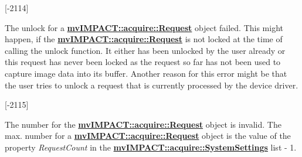 \begin{Desc}
\begin{description}
{\bfseries }\mbox{[}-\/2114\mbox{]} \item[{\em 
\hypertarget{group___common_interface_gga112225e5fbaaaef6445ff4ebf98f8e03ae52bb6755c7ab0ae3eaf035e4ce0e05c}{D\+E\+V\+\_\+\+R\+E\+Q\+U\+E\+S\+T\+\_\+\+C\+A\+N\+T\+\_\+\+B\+E\+\_\+\+U\+N\+L\+O\+C\+K\+E\+D}\label{group___common_interface_gga112225e5fbaaaef6445ff4ebf98f8e03ae52bb6755c7ab0ae3eaf035e4ce0e05c}
}]The unlock for a {\bfseries \hyperlink{classmv_i_m_p_a_c_t_1_1acquire_1_1_request}{mv\+I\+M\+P\+A\+C\+T\+::acquire\+::\+Request}} object failed. This might happen, if the {\bfseries \hyperlink{classmv_i_m_p_a_c_t_1_1acquire_1_1_request}{mv\+I\+M\+P\+A\+C\+T\+::acquire\+::\+Request}} is not locked at the time of calling the unlock function. It either has been unlocked by the user already or this request has never been locked as the request so far has not been used to capture image data into its buffer. Another reason for this error might be that the user tries to unlock a request that is currently processed by the device driver.

{\bfseries }\mbox{[}-\/2115\mbox{]} \item[{\em 
\hypertarget{group___common_interface_gga112225e5fbaaaef6445ff4ebf98f8e03a0cd306e4e845176cdc4537ec6757b5fa}{D\+E\+V\+\_\+\+I\+N\+V\+A\+L\+I\+D\+\_\+\+R\+E\+Q\+U\+E\+S\+T\+\_\+\+N\+U\+M\+B\+E\+R}\label{group___common_interface_gga112225e5fbaaaef6445ff4ebf98f8e03a0cd306e4e845176cdc4537ec6757b5fa}
}]The number for the {\bfseries \hyperlink{classmv_i_m_p_a_c_t_1_1acquire_1_1_request}{mv\+I\+M\+P\+A\+C\+T\+::acquire\+::\+Request}} object is invalid. The max. number for a {\bfseries \hyperlink{classmv_i_m_p_a_c_t_1_1acquire_1_1_request}{mv\+I\+M\+P\+A\+C\+T\+::acquire\+::\+Request}} object is the value of the property {\itshape Request\+Count} in the {\bfseries \hyperlink{classmv_i_m_p_a_c_t_1_1acquire_1_1_system_settings}{mv\+I\+M\+P\+A\+C\+T\+::acquire\+::\+System\+Settings}} list -\/ 1.


\end{description}
\end{Desc}
